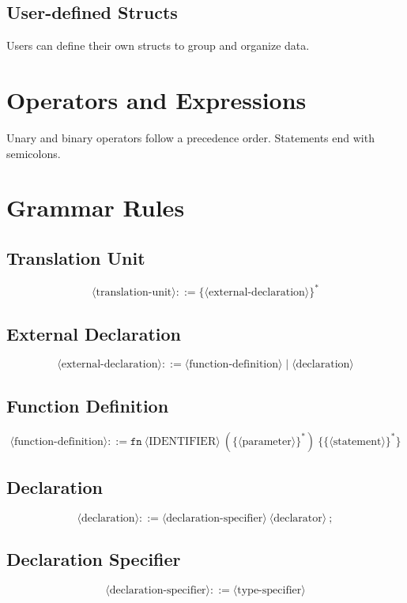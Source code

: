 \documentclass{article}
\begin{document}
\subsection{User-defined Structs}

Users can define their own structs to group and organize data.

\section{Operators and Expressions}
Unary and binary operators follow a precedence order. Statements end with semicolons.


\section{Grammar Rules}

\subsection{Translation Unit}
\[
\langle \text{translation-unit} \rangle ::= \{ \langle \text{external-declaration} \rangle \}^*
\]

\subsection{External Declaration}
\[
\langle \text{external-declaration} \rangle ::= \langle \text{function-definition} \rangle 
\mid \langle \text{declaration} \rangle
\]

\subsection{Function Definition}
\[
\langle \text{function-definition} \rangle ::= \texttt{fn} \ \langle \text{IDENTIFIER} \rangle \ ( \{ \langle \text{parameter} \rangle \}^* ) \ \{ \{ \langle \text{statement} \rangle \}^* \}
\]

\subsection{Declaration}
\[
\langle \text{declaration} \rangle ::= \langle \text{declaration-specifier} \rangle \ \langle \text{declarator} \rangle \ ;
\]

\subsection{Declaration Specifier}
\[
\langle \text{declaration-specifier} \rangle ::= \langle \text{type-specifier} \rangle
\]
\end{document}
